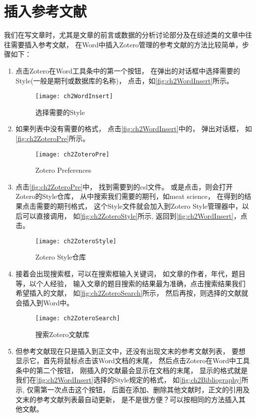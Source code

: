 \documentclass[cn,11pt,chinese]{elegantbook}
\begin{document}
		\section{插入参考文献}\label{sec:insertRef}
		我们在写文章时，尤其是文章的前言或数据的分析讨论部分及在综述类的文章中往往需要插入参考文献，
		在Word中插入Zotero管理的参考文献的方法比较简单，步骤如下：
		\begin{enumerate}
			\item
			点击Zotero在Word工具条中的第一个按钮，
			在弹出的对话框中选择需要的Style(一般是期刊或数据库的名称)，
			点击，如\autoref{fig:ch2WordInsert}所示。
			\begin{figure}[htbp]
				\centering
				\texttt{[image: ch2WordInsert]}
				\caption{选择需要的Style}
				\label{fig:ch2WordInsert}
			\end{figure}
			\item
			如果列表中没有需要的格式\label{tag:notyle}，
			点击\autoref{fig:ch2WordInsert}中的，
			弹出对话框，
			如\autoref{fig:ch2ZoteroPre}所示。
			\begin{figure}[htbp]
				\centering
				\texttt{[image: ch2ZoteroPre]}
				\caption{Zotero Preferences}
				\label{fig:ch2ZoteroPre}
			\end{figure}
			\item
			点击\autoref{fig:ch2ZoteroPre}中\menu{+}，
			找到需要到的csl文件。
			或是点击，则会打开Zotero的Style仓库，
			从中搜索我们需要的期刊，如meat science，
			在得到的结果点击需要的期刊格式，
			这个Style文件就会加入到Zotero Style管理器中，以后可以直接调用，
			如\autoref{fig:ch2ZoteroStyle}所示,
			返回到\autoref{fig:ch2WordInsert}，点击。
			\begin{figure}[htbp]
				\centering
				\texttt{[image: ch2ZoteroStyle]}
				\caption{Zotero Style仓库}
				\label{fig:ch2ZoteroStyle}
			\end{figure}
			\item
			接着会出现搜索框，可以在搜索框输入关键词，
			如文章的作者，年代，题目等，以个人经验，
			输入文章的题目搜索的结果最为准确，点击搜索结果我们希望插入的文献，
			如\autoref{fig:ch2ZoteroSearch}所示，
			然后再按，则选择的文献就会插入到Word中。
			\begin{figure}[htbp]
				\centering
				\texttt{[image: ch2ZoteroSearch]}
				\caption{搜索Zotero文献库}
				\label{fig:ch2ZoteroSearch}
			\end{figure}
			\item
			但参考文献现在只是插入到正文中，还没有出现文末的参考文献列表，
			要想显示它，首先将鼠标点击该Word文档的末尾，
			然后点击Zotero在Word中工具条中的第二个按钮，
			刚插入的文献最会显示在文档的末尾，
			显示的格式就是我们在\autoref{fig:ch2WordInsert}选择的Style规定的格式，
			如\autoref{fig:ch2Bibliography}所示,
			仅需第一次点击这个按钮，
			后面在添加、删除其他文献时，正文的引用及文末的参考文献列表最自动更新，
			是不是很方便？可以按相同的方法插入其他文献。
			

\end{enumerate}
\end{document}
